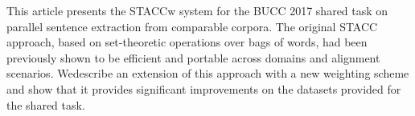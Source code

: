 This article presents the STACCw system for the BUCC 2017 shared task on parallel sentence extraction from comparable corpora. The original STACC approach, based on set-theoretic operations over bags of words, had been previously shown to be efficient and portable across domains and alignment scenarios. Wedescribe an extension of this approach with a new weighting scheme and show that it provides significant improvements on the datasets provided for the shared task.
